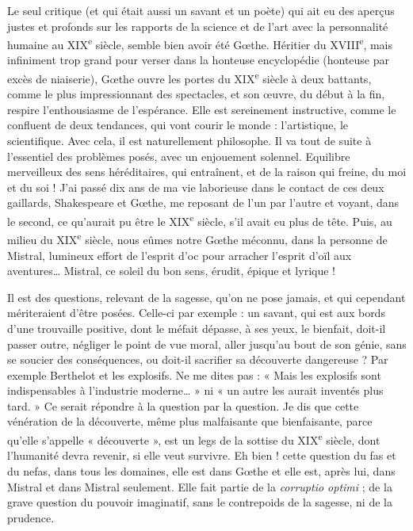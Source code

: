 \documentclass[french,twoside]{book} %
\begin{document}
Le seul critique (et qui était aussi un savant et un poète) qui ait eu des aperçus justes et profonds sur les rapports de la science et de l’art avec la personnalité humaine au XIX\textsuperscript{e} siècle, semble bien avoir été Gœthe. Héritier du XVIII\textsuperscript{e}, mais infiniment trop grand pour verser dans la honteuse encyclopédie (honteuse par excès de niaiserie), Gœthe ouvre les portes du XIX\textsuperscript{e} siècle à deux battants, comme le plus impressionnant des spectacles, et son œuvre, du début à la fin, respire l’enthousiasme de l’espérance. Elle est sereinement instructive, comme le confluent de deux tendances, qui vont courir le monde : l’artistique, le scientifique. Avec cela, il est naturellement philosophe. Il va tout de suite à l’essentiel des problèmes posés, avec un enjouement solennel. Equilibre merveilleux des sens héréditaires, qui entraînent, et de la raison qui freine, du moi et du soi ! J’ai passé dix ans de ma vie laborieuse dans le contact de ces deux gaillards, Shakespeare et Gœthe, me reposant de l’un par l’autre et voyant, dans le second, ce qu’aurait pu être le XIX\textsuperscript{e} siècle, s’il avait eu plus de tête. Puis, au milieu du XIX\textsuperscript{e} siècle, nous eûmes notre Gœthe méconnu, dans la personne de Mistral, lumineux effort de l’esprit d’oc pour arracher l’esprit d’oïl aux aventures… Mistral, ce soleil du bon sens, érudit, épique et lyrique !\par
Il est des questions, relevant de la sagesse, qu’on ne pose jamais, et qui cependant mériteraient d’être posées. Celle-ci par exemple : un savant, qui est aux bords d’une trouvaille positive, dont le méfait dépasse, à ses yeux, le bienfait, doit-il passer outre, négliger le point de vue moral, aller jusqu’au bout de son génie, sans se soucier des conséquences, ou doit-il sacrifier sa découverte dangereuse ? Par exemple Berthelot et les explosifs. Ne me dites pas : « Mais les explosifs sont indispensables à l’industrie moderne… » ni « un autre les aurait inventés plus tard. » Ce serait répondre à la question par la question. Je dis que cette vénération de la découverte, même plus malfaisante que bienfaisante, parce qu’elle s’appelle « découverte », est un legs de la sottise du XIX\textsuperscript{e} siècle, dont l’humanité devra revenir, si elle veut survivre. Eh bien ! cette question du fas et du nefas, dans tous les domaines, elle est dans Gœthe et elle est, après lui, dans Mistral et dans Mistral seulement. Elle fait partie de la {\itshape corruptio optimi} ; de la grave question du pouvoir imaginatif, sans le contrepoids de la sagesse, ni de la prudence.\par
\end{document}
